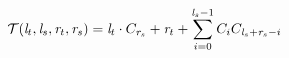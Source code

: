 \begin{eqnarray}  \label{fun:tid}
  {\cal T}({\mathit l}_t, {\mathit l}_s, {\mathit r}_t, {\mathit r}_s)
    = {\mathit l}_t \cdot C_{{\mathit r}_s} + {\mathit r}_t + 
          \sum_{i = 0}^{{\mathit l}_s - 1} C_i C_{{\mathit l}_s + {\mathit r}_s - i}
\end{eqnarray}
